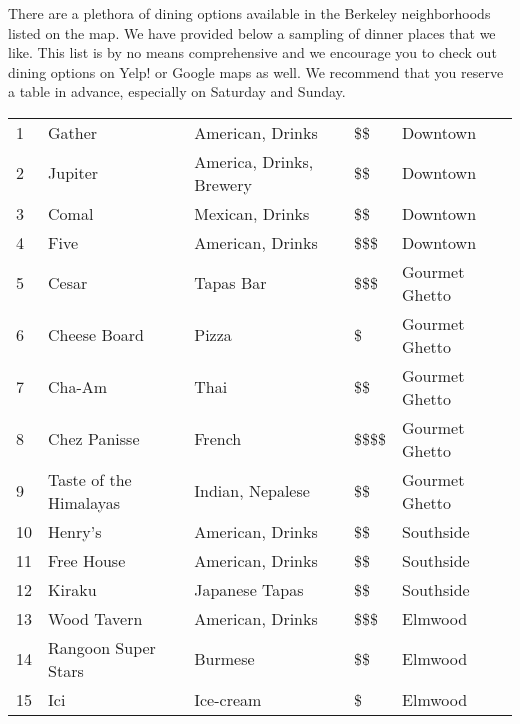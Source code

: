 There are a plethora of dining options available in the Berkeley neighborhoods listed on the map. We have provided below a sampling of dinner places that we like. This list is by no means comprehensive and we encourage you to check out dining options on Yelp! or Google maps as well. We recommend that you reserve a table in advance, especially on Saturday and Sunday.

\begingroup
\small
\begin{multicols}{1}[]
    \begin{tabular}{p{0.3cm} p{4cm} p{5cm} p{1cm} p{2cm}}
        1 & Gather & American, Drinks & \$\$ & Downtown \\
        2 & Jupiter & America, Drinks, Brewery & \$\$ & Downtown \\
	    3 & Comal & Mexican, Drinks & \$\$ & Downtown \\       
	    4 & Five & American, Drinks & \$\$\$ & Downtown \\ 
        5 & Cesar & Tapas Bar & \$\$\$ & Gourmet Ghetto\\
        6 & Cheese Board & Pizza & \$ & Gourmet Ghetto \\
        7 & Cha-Am & Thai & \$\$ & Gourmet Ghetto\\
        8 & Chez Panisse & French & \$\$\$\$ & Gourmet Ghetto \\
        9 & Taste of the Himalayas & Indian, Nepalese & \$\$ & Gourmet Ghetto \\
        10 & Henry's & American, Drinks & \$\$ & Southside \\
        11 & Free House & American, Drinks & \$\$ & Southside \\
        12 & Kiraku & Japanese Tapas & \$\$ & Southside \\
        13 & Wood Tavern & American, Drinks & \$\$\$ & Elmwood \\
        14 & Rangoon Super Stars & Burmese & \$\$ & Elmwood\\
        15 & Ici & Ice-cream & \$ & Elmwood\\
    \end{tabular}
\end{multicols}
\endgroup
\normalsize 

\setlength\fboxrule{0pt}
